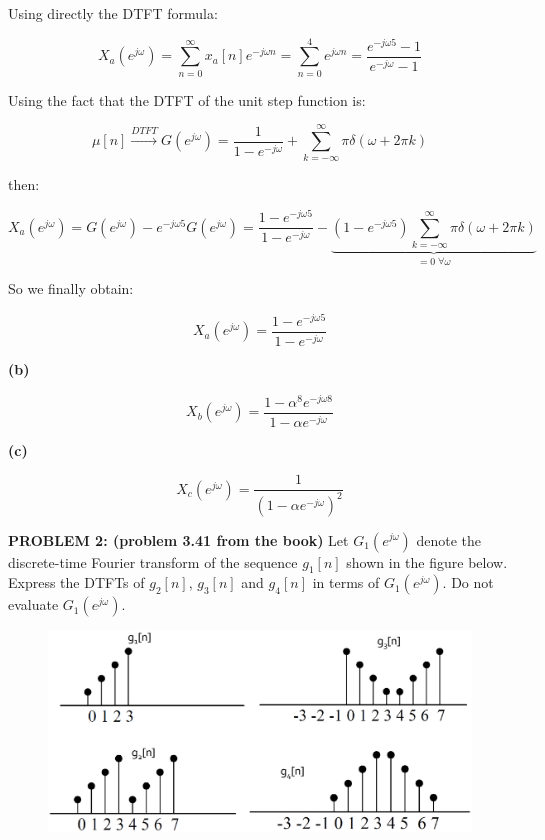 \documentclass[a4paper,11pt,oneside]{article}
\begin{document}
Using directly the DTFT formula:

\[
X_a(e^{j\omega})=\sum_{n=0}^{\infty}x_a[n]e^{-j\omega n}=\sum_{n=0}^{4}e^{j\omega n}=\frac{e^{-j\omega 5}-1}{e^{-j\omega}-1}
\]

Using the fact that the DTFT of the unit step function is:

\[
\mu[n]\stackrel{DTFT}{\rightarrow} G(e^{j\omega})=\frac{1}{1-e^{-j\omega}}+\sum_{k=-\infty}^{\infty}\pi \delta(\omega+2\pi k)
\]

then:

\[ 
X_a(e^{j\omega})=G(e^{j\omega})-e^{-j\omega 5}G(e^{j\omega})=\frac{1-e^{-j\omega 5}}{1-e^{-j\omega}}-\underbrace{(1-e^{-j\omega 5})\sum_{k=-\infty}^{\infty}\pi \delta(\omega+2\pi k)}_{=0 \; \forall \omega}
\]

So we finally obtain:

\[ 
X_a(e^{j\omega})=\frac{1-e^{-j\omega 5}}{1-e^{-j\omega}}
\]

\vspace{.5cm}



\textbf{(b)}

\[
X_b(e^{j\omega})=\frac{1-\alpha^8 e^{-j\omega 8}}{1-\alpha e^{-j\omega}}
\]


\vspace{.5cm}
\textbf{(c)}

\[
X_c(e^{j\omega})=\frac{1}{(1-\alpha e^{-j\omega})^2}
\]
\vspace{1cm}


\textbf{PROBLEM 2: (problem 3.41 from the book)} Let $G_1(e^{j\omega})$ denote the discrete-time Fourier transform of the sequence $g_1[n]$ shown in the figure below. Express the DTFTs of $g_2[n]$, $g_3[n]$ and $g_4[n]$ in terms of $G_1(e^{j\omega})$. Do not evaluate $G_1(e^{j\omega})$.


\begin{figure}[ht!]
\centering
\includegraphics[width=.8\textwidth]{fig4.eps}
\end{figure}
\end{document}
